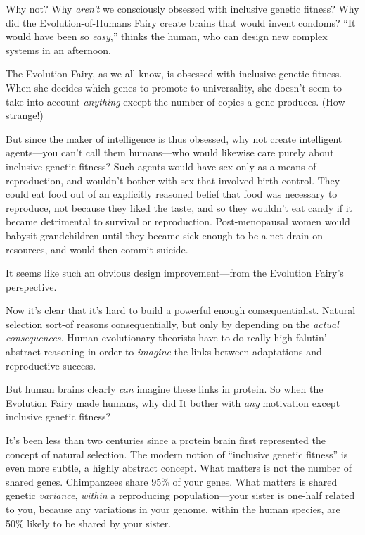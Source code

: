 {
 Why not? Why \textit{aren't} we consciously
obsessed with inclusive genetic fitness? Why did the
Evolution-of-Humans Fairy create brains that would invent condoms?
``It would have been so
\textit{easy},'' thinks the human, who can design new
complex systems in an afternoon.}

{
 The Evolution Fairy, as we all know, is obsessed with inclusive
genetic fitness. When she decides which genes to promote to
universality, she doesn't seem to take into account
\textit{anything} except the number of copies a gene produces. (How
strange!)}

{
 But since the maker of intelligence is thus obsessed, why not
create intelligent agents---you can't call them
humans---who would likewise care purely about inclusive genetic
fitness? Such agents would have sex only as a means of reproduction,
and wouldn't bother with sex that involved birth
control. They could eat food out of an explicitly reasoned belief that
food was necessary to reproduce, not because they liked the taste, and
so they wouldn't eat candy if it became detrimental to
survival or reproduction. Post-menopausal women would babysit
grandchildren until they became sick enough to be a net drain on
resources, and would then commit suicide.}

{
 It seems like such an obvious design improvement---from the
Evolution Fairy's perspective.}

{
 Now it's clear that it's hard to
build a powerful enough consequentialist. Natural selection sort-of
reasons consequentially, but only by depending on the \textit{actual
consequences.} Human evolutionary theorists have to do really
high-falutin' abstract reasoning in order to
\textit{imagine} the links between adaptations and reproductive
success.}

{
 But human brains clearly \textit{can} imagine these links in
protein. So when the Evolution Fairy made humans, why did It bother
with \textit{any} motivation except inclusive genetic fitness?}

{
 It's been less than two centuries since a protein
brain first represented the concept of natural selection. The modern
notion of ``inclusive genetic
fitness'' is even more subtle, a highly abstract
concept. What matters is not the number of shared genes. Chimpanzees
share 95\% of your genes. What matters is shared genetic
\textit{variance}, \textit{within} a reproducing population---your
sister is one-half related to you, because any variations in your
genome, within the human species, are 50\% likely to be shared by your
sister.}

